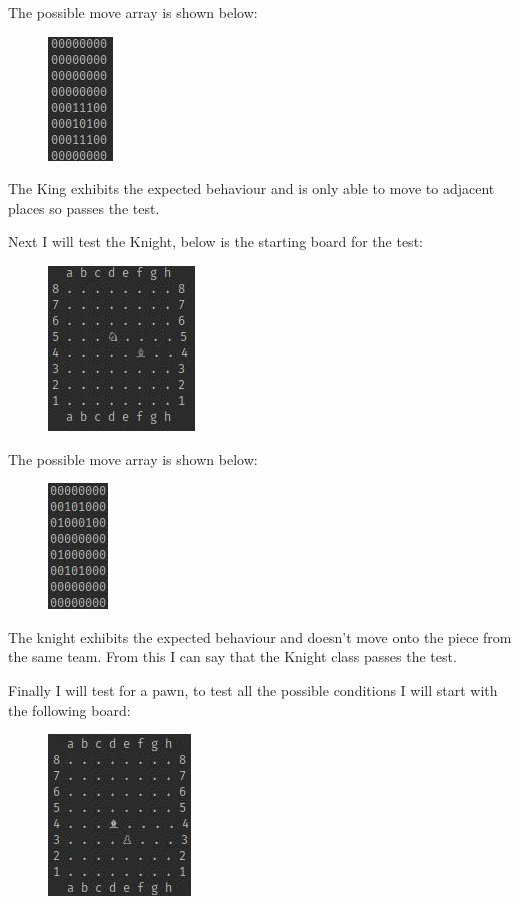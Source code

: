 \documentclass[a4paper]{article}
\begin{document}
The possible move array is shown below:
\begin{figure}[H]
\centering
\includegraphics[scale=2.5]{kingPosMoves}
\end{figure}

The King exhibits the expected behaviour and is only able to move to adjacent places so passes the test.

Next I will test the Knight, below is the starting board for the test: 
\begin{figure}[H]
\centering
\includegraphics[scale=2.5]{knightStartPos}
\end{figure}

The possible move array is shown below: 
\begin{figure}[H]
\centering
\includegraphics[scale=2.5]{knightPosMoves}
\end{figure}

The knight exhibits the expected behaviour and doesn't move onto the piece from the same team. From this I can say that the Knight class passes the test.


Finally I will test for a pawn, to test all the possible conditions I will start with the following board:
\begin{figure}[H]
\centering
\includegraphics[scale=2.5]{pawnStartPos}
\end{figure}
\end{document}
